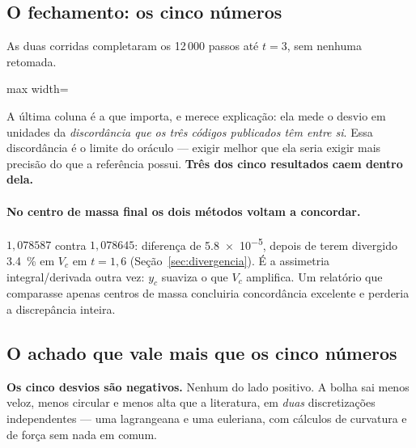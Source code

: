 \subsection{O fechamento: os cinco n\'umeros}
\label{sec:fechamento}

As duas corridas completaram os 12\,000 passos at\'e $t=3$, sem nenhuma retomada.

\begin{adjustbox}{max width=\linewidth}
\end{adjustbox}

A \'ultima coluna \'e a que importa, e merece explica\c{c}\~ao: ela mede o desvio
em unidades da \emph{discord\^ancia que os tr\^es c\'odigos publicados t\^em entre
si}. Essa discord\^ancia \'e o limite do or\'aculo --- exigir melhor que ela seria
exigir mais precis\~ao do que a refer\^encia possui. \textbf{Tr\^es dos cinco
resultados caem dentro dela.}

\paragraph{No centro de massa final os dois m\'etodos voltam a concordar.}
$1{,}078587$ contra $1{,}078645$: diferen\c{c}a de \num{5.8e-5}, depois de terem
divergido \SI{3.4}{\percent} em $V_c$ em $t=1{,}6$
(Se\c{c}\~ao~\ref{sec:divergencia}). \'E a assimetria integral/derivada outra vez:
$y_c$ suaviza o que $V_c$ amplifica. Um relat\'orio que comparasse apenas centros
de massa concluiria concord\^ancia excelente e perderia a discrep\^ancia inteira.

\subsection{O achado que vale mais que os cinco n\'umeros}
\label{sec:vies}

\textbf{Os cinco desvios s\~ao negativos.} Nenhum do lado positivo. A bolha sai
menos veloz, menos circular e menos alta que a literatura, em \emph{duas}
discretiza\c{c}\~oes independentes --- uma lagrangeana e uma euleriana, com
c\'alculos de curvatura e de for\c{c}a sem nada em comum.

